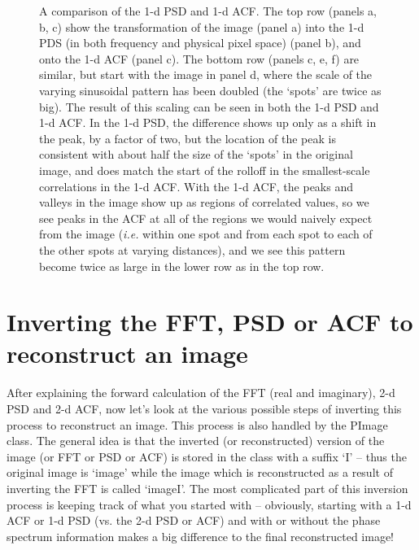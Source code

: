 \documentclass[11pt,preprint]{aastex}
\begin{document}
\begin{figure}[htpb]
\caption{{\small 
A comparison of the 1-d PSD and 1-d ACF. The top row (panels a, b, c) show the transformation of the image (panel a) into the 1-d PDS (in both frequency and physical pixel space) (panel b), and onto the 1-d ACF (panel c). The bottom row (panels c, e, f) are similar, but start with the image in panel d, where the scale of the varying sinusoidal pattern has been doubled (the `spots' are twice as big). The result of this scaling can be seen in both the 1-d PSD and 1-d ACF. In the 1-d PSD, the difference shows up only as a shift in the peak, by a factor of two, but the location of the peak is consistent with about half the size of the `spots' in the original image, and does match the start of the rolloff in the smallest-scale correlations in the 1-d ACF. With the 1-d ACF, the peaks and valleys in the image show up as regions of correlated values, so we see peaks in the ACF at all of the regions we would naively expect from the image ({\it i.e.} within one spot and from each spot to each of the other spots at varying distances), and we see this pattern become twice as large in the lower row as in the top row. }}
\label{fig:1d_psd_acf}
\end{figure}


\section{Inverting the FFT, PSD or ACF to reconstruct an image}

After explaining the forward calculation of the FFT (real and imaginary), 2-d PSD and 2-d ACF, now let's look at the various possible steps of inverting this process to reconstruct an image. This process is also handled by the PImage class. The general idea is that the inverted (or reconstructed) version of the image (or FFT or PSD or ACF) is stored in the class with a suffix `I' -- thus the original image is `image' while the image which is reconstructed as a result of inverting the FFT is called `imageI'.  The most complicated part of this inversion process is keeping track of what you started with -- obviously, starting with a 1-d ACF or 1-d PSD (vs. the 2-d PSD or ACF) and with or without the phase spectrum information makes a big difference to the final reconstructed image! 
\end{document}
